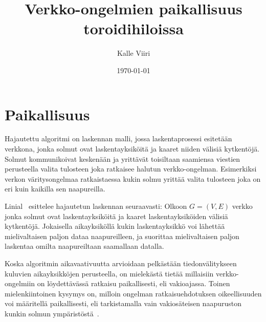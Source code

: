 \documentclass[12pt,finnish]{tktltiki2}
\title{Verkko-ongelmien paikallisuus toroidihiloissa}
\author{Kalle Viiri}
\date{\today}
\theoremstyle{definition}
\theoremstyle{remark}
\begin{document}

\frontmatter      %

\maketitle        %
\makeabstract     %

\tableofcontents  %


\mainmatter       %

\section{Paikallisuus}

Hajautettu algoritmi on laskennan malli, jossa laskentaprosessi esitetään verkkona, jonka solmut ovat laskentayksiköitä ja kaaret niiden välisiä kytkentöjä. Solmut kommunikoivat keskenään ja yrittävät toisiltaan saamiensa viestien perusteella valita tulosteen joka ratkaisee halutun verkko-ongelman. Esimerkiksi verkon väritysongelmaa ratkaistaessa kukin solmu yrittää valita tulosteen joka on eri kuin kaikilla sen naapureilla.


Linial~\cite{linial92} esittelee hajautetun laskennan seuraavasti: Olkoon $G = (V, E)$ verkko jonka solmut ovat laskentayksiköitä ja kaaret laskentayksiköiden välisiä kytkentöjä. Jokaisella aikayksiköllä kukin laskentayksikkö voi lähettää mielivaltaisen paljon dataa naapureilleen, ja suorittaa mielivaltaisen paljon laskentaa omilta naapureiltaan saamallaan datalla.

Koska algoritmin aikavaativuutta arvioidaan pelkästään tiedonvälitykseen kuluvien aikayksikköjen perusteella, on mielekästä tietää millaisiin verkko-ongelmiin on löydettävässä ratkaisu paikallisesti, eli vakioajassa. Toinen mielenkiintoinen kysymys on, milloin ongelman ratkaisuehdotuksen oikeellisuuden voi määritellä paikallisesti, eli tarkistamalla vain vakiosäteisen naapuruston kunkin solmun ympäristöstä~\cite{linial92}.

\end{document}

